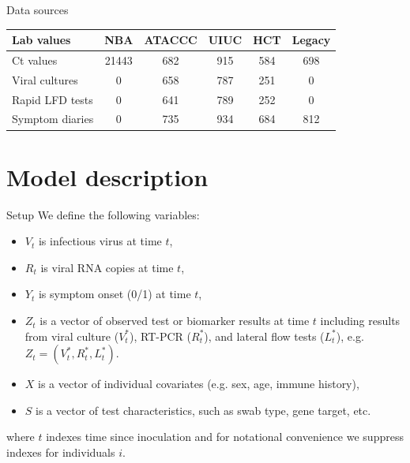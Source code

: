 \documentclass[9pt, aspectratio=169]{beamer}
\begin{document}
\begin{frame}{Data sources}
\begin{table}
\centering
\begin{tabular}{lccccc}
\toprule
Lab values & NBA & ATACCC & UIUC & HCT & Legacy\\
\midrule
Ct values & 21443 & 682 & 915 & 584 & 698\\
Viral cultures & 0 & 658 & 787 & 251 & 0\\
Rapid LFD tests & 0 & 641 & 789 & 252 & 0\\
Symptom diaries & 0 & 735 & 934 & 684 & 812\\
\bottomrule
\end{tabular}
\end{table}
\end{frame}

\section{Model description}
\begin{frame}{Setup}
We define the following variables:
\begin{itemize}
    \vfill
    \item $V_t$ is infectious virus  at time $t$,
    \vfill
    \item $R_t$ is viral RNA copies at time $t$,
    \vfill
    \item $Y_t$ is symptom onset (0/1) at time $t$,
    \vfill
    \item $Z_t$ is a vector of observed test or biomarker results at time $t$ including results from viral culture ($V^*_t$), RT-PCR ($R^*_t$), and lateral flow tests ($L^*_t$), e.g. $Z_t = (V^*_t, R^*_t, L^*_t)$.
    \vfill
    \item $X$ is a vector of individual covariates (e.g. sex, age, immune history),
    \vfill
    \item $S$ is a vector of test characteristics, such as swab type, gene target, etc.
    \vfill
\end{itemize}
where $t$ indexes time since inoculation and for notational convenience we suppress indexes for individuals $i$.
\vfill
\end{frame}
\end{document}
